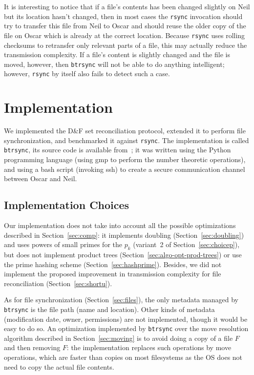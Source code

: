 \documentclass{llncs}
\newcommand{\df}{D\&F\xspace}
\newcommand{\btrsync}{\texttt{btrsync}\xspace}
\newcommand{\rsync}{\texttt{rsync}\xspace}
\begin{document}
It is interesting to notice that if a file's contents has been changed slightly on Neil but its location hasn't changed, then in most cases the \rsync invocation should try to transfer this file from Neil to Oscar and should reuse the older copy of the file on Oscar which is already at the correct location. Because \rsync uses rolling checksums to retransfer only relevant parts of a file, this may actually reduce the transmission complexity. If a file's content is slightly changed and the file is moved, however, then \btrsync will not be able to do anything intelligent; however, \rsync by itself also fails to detect such a case.

\section{Implementation}
\label{sec:program}

We implemented the \df set reconciliation protocol, extended it to perform file
synchronization, and benchmarked it against \rsync. The implementation is called
\btrsync, its source code is available from~\cite{Robin}; it was written using
the Python programming language (using {\sf gmp} to perform the number theoretic
operations), and using a bash script (invoking ssh) to create a secure communication
channel between Oscar and Neil.

\subsection{Implementation Choices}

Our implementation does not take into account all the possible optimizations
described in Section~\ref{sec:comp}: it implements doubling
(Section~\ref{sec:doubling}) and uses powers of small primes for the $p_k$
(variant~2 of Section~\ref{sec:choicep}), but does not implement product trees
(Section~\ref{sec:algo-opt-prod-trees}) or use the prime hashing scheme
(Section~\ref{sec:hashprime}).
Besides, we did not implement the proposed improvement in transmission complexity for file reconciliation (Section~\ref{sec:shortu}).

As for file synchronization (Section~\ref{sec:files}), the only metadata managed by
\btrsync is the file path (name and location). Other kinds of metadata
(modification date, owner, permissions) are not implemented, though it would be
easy to do so. An optimization implemented by \btrsync over the move resolution algorithm described in Section~\ref{sec:moving} is to avoid doing a copy of a file $F$ and then removing $F$: the implementation replaces such operations by move operations, which are faster than copies on most filesystems as the OS does not need to copy the actual file contents.
\end{document}

